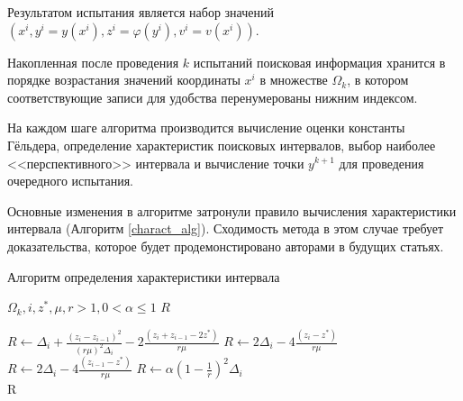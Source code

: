 \documentclass[a4paper,12pt,russian]{article}
\begin{document}
Результатом испытания является набор значений $(x^i, y^i=y(x^i), z^i = \varphi(y^i), v^i = v(x^i))$. 

Накопленная после проведения $k$ испытаний поисковая информация хранится в порядке возрастания значений координаты $x^i$ в множестве $\Omega_k$, в котором соответствующие записи для удобства перенумерованы нижним индексом.

На каждом шаге алгоритма производится вычисление оценки константы Гёльдера, определение характеристик поисковых интервалов, выбор наиболее <<перспективного>> интервала и вычисление точки $y^{k+1}$ для проведения очередного испытания.

Основные изменения в алгоритме затронули правило вычисления характеристики интервала (Алгоритм \ref{charact_alg}). Сходимость метода в этом случае требует доказательства, которое будет продемонстировано авторами в будущих статьях.


\begin{algorithm}
\caption{Алгоритм определения характеристики интервала}\label{charact_alg}
\begin{algorithmic}[1]
\Require $\Omega_k, i, z^*, \mu, r >1, 0 < \alpha \leq 1$
\Ensure $R$

  
           \State $R \gets \Delta _i+\frac {{(z_i-z_{i-1})}^2}{{(r \mu)}^2 \Delta _i} - 2 \frac {(z_i+z_{i-1}-2z^*)}{r \mu}$
  
           \State $R \gets 2 \Delta _i-4 \frac {(z_i-z^*)}{r \mu}$
 
            \State $ R \gets 2 \Delta _i-4 \frac {(z_{i-1}-z^*)}{r \mu}$
\Else {}
           \State $R \gets \alpha{(1-\frac{1}{r})}^2 \Delta _i$
\EndIf\\
\Return R
\end{algorithmic}
\end{algorithm}
\end{document}
